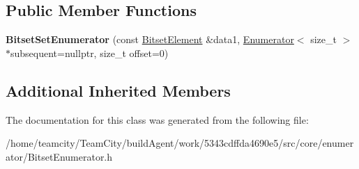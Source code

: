 \subsection*{Public Member Functions}
\begin{DoxyCompactItemize}
\item 
{\bfseries Bitset\+Set\+Enumerator} (const \hyperlink{classBitsetElement}{Bitset\+Element} \&data1, \hyperlink{classEnumerator}{Enumerator}$<$ size\+\_\+t $>$ $\ast$subsequent=nullptr, size\+\_\+t offset=0)\hypertarget{classBitsetSetEnumerator_a0edfcef06f94f81e2faf8ad9eca0c791}{}\label{classBitsetSetEnumerator_a0edfcef06f94f81e2faf8ad9eca0c791}

\end{DoxyCompactItemize}
\subsection*{Additional Inherited Members}


The documentation for this class was generated from the following file\+:\begin{DoxyCompactItemize}
\item 
/home/teamcity/\+Team\+City/build\+Agent/work/5343cdffda4690e5/src/core/enumerator/Bitset\+Enumerator.\+h\end{DoxyCompactItemize}
